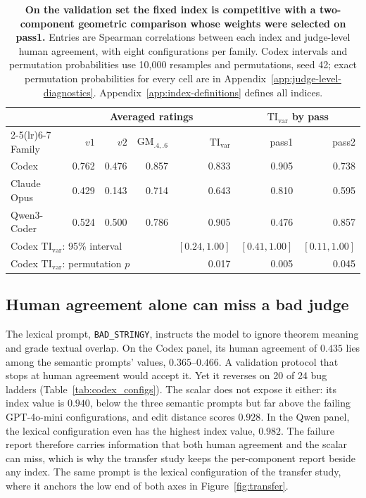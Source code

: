 \begin{table}[htbp]
\centering\small
\begin{tabular}{@{}lrrrrrr@{}}
\toprule
& \multicolumn{4}{c}{Averaged ratings} & \multicolumn{2}{c}{$\mathrm{TI}_{\mathrm{var}}$ by pass} \\
\cmidrule(lr){2-5}\cmidrule(lr){6-7}
Family & $v1$ & $v2$ & $\mathrm{GM}_{.4,.6}$ & $\mathrm{TI}_{\mathrm{var}}$ & pass1 & pass2 \\
\midrule
Codex & 0.762 & 0.476 & 0.857 & 0.833 & 0.905 & 0.738 \\
Claude Opus & 0.429 & 0.143 & 0.714 & 0.643 & 0.810 & 0.595 \\
Qwen3-Coder & 0.524 & 0.500 & 0.786 & 0.905 & 0.476 & 0.857 \\
\midrule
\multicolumn{4}{l}{Codex $\mathrm{TI}_{\mathrm{var}}$: 95\% interval} & $[0.24,1.00]$ & $[0.41,1.00]$ & $[0.11,1.00]$ \\
\multicolumn{4}{l}{Codex $\mathrm{TI}_{\mathrm{var}}$: permutation $p$} & 0.017 & 0.005 & 0.045 \\
\bottomrule
\end{tabular}
\caption{\textbf{On the validation set the fixed index is competitive with a two-component geometric comparison whose weights were selected on pass1.} Entries are Spearman correlations between each index and judge-level human agreement, with eight configurations per family.
Codex intervals and permutation probabilities use 10{,}000 resamples and permutations, seed 42; exact permutation probabilities for every cell are in Appendix~\ref{app:judge-level-diagnostics}.
Appendix~\ref{app:index-definitions} defines all indices.}
\label{tab:tivar_cross_model_results}\label{tab:cross_model_index_compare_avg}
\end{table}

\subsection{Human agreement alone can miss a bad judge}\label{sec:lexical-judge}
The lexical prompt, \texttt{BAD\_STRINGY}, instructs the model to ignore theorem meaning and grade textual overlap.
On the Codex panel, its human agreement of $0.435$ lies among the semantic prompts' values, $0.365$--$0.466$.
A validation protocol that stops at human agreement would accept it.
Yet it reverses on 20 of 24 bug ladders (Table~\ref{tab:codex_configs}).
The scalar does not expose it either: its index value is $0.940$, below the three semantic prompts but far above the failing GPT-4o-mini configurations, and edit distance scores $0.928$.
In the Qwen panel, the lexical configuration even has the highest index value, $0.982$.
The failure report therefore carries information that both human agreement and the scalar can miss, which is why the transfer study keeps the per-component report beside any index.
The same prompt is the lexical configuration of the transfer study, where it anchors the low end of both axes in Figure~\ref{fig:transfer}.

